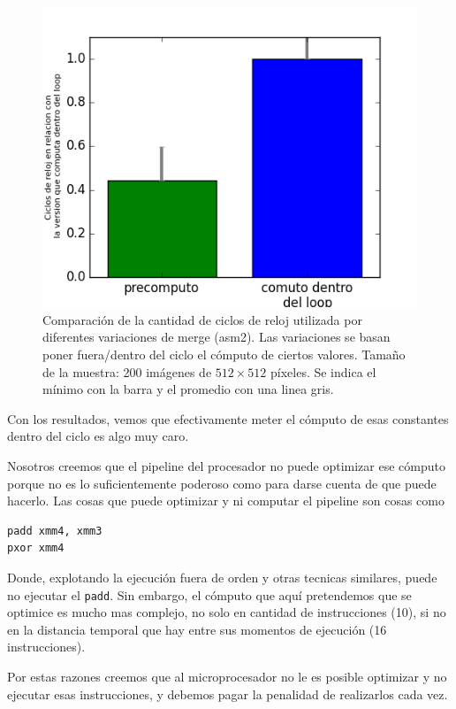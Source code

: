 \begin{figure}[H] 
	\centering
  \includegraphics[scale=0.7]{merge-afuera.png}
  \caption{Comparación de la cantidad de ciclos de reloj utilizada por diferentes variaciones de merge (asm2). Las variaciones se basan poner fuera/dentro del ciclo el cómputo de ciertos valores. Tamaño de la muestra: 200 imágenes de $512 \times 512$ píxeles. Se indica el mínimo con la barra y el promedio con una linea gris.}
\end{figure}

Con los resultados, vemos que efectivamente meter el cómputo de esas constantes dentro del ciclo es algo muy caro. 

Nosotros creemos que el pipeline del procesador no puede optimizar ese cómputo porque no es lo suficientemente poderoso como para darse cuenta de que puede hacerlo. Las cosas que puede optimizar y ni computar el pipeline son cosas como


\begin{lstlisting}
padd xmm4, xmm3
pxor xmm4
\end{lstlisting}

Donde, explotando la ejecución fuera de orden y otras tecnicas similares, puede no ejecutar el \texttt{padd}. Sin embargo, el cómputo que aquí pretendemos que se optimice es mucho mas complejo, no solo en cantidad de instrucciones (10), si no en la distancia temporal que hay entre sus momentos de ejecución (16 instrucciones).

Por estas razones creemos que al microprocesador no le es posible optimizar y no ejecutar esas instrucciones, y debemos pagar la penalidad de realizarlos cada vez.






